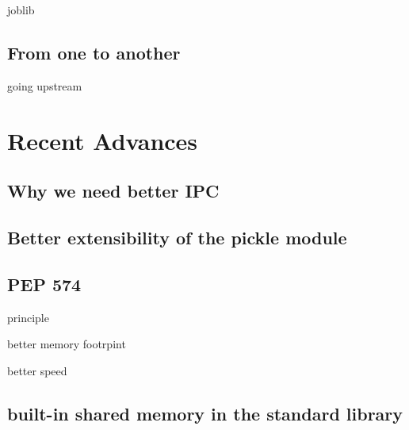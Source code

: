 \documentclass[13pt, usenames,dvipsnames]{beamer} %
\begin{document}
    \begin{frame}[t]{joblib}
    \end{frame}
    \subsection{From one to another}
        \begin{frame}[t]{going upstream}

        \end{frame}

\section{Recent Advances}
\subsection{Why we need better IPC}
\subsection{Better extensibility of the pickle module}
\subsection{PEP 574}
    \begin{frame}[t]{principle}
    \end{frame}

    \begin{frame}[t]{better memory footrpint}
    \end{frame}

    \begin{frame}[t]{better speed}
    \end{frame}
\subsection{built-in shared memory in the standard library}



\begin{frame}[fragile]{}
    \begin{beamerboxesrounded}{}
        \inputminted[bgcolor=beige]{python}{scripts/test_script.py}
    \end{beamerboxesrounded}
\end{frame}
\end{document}
